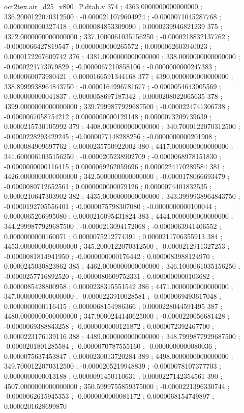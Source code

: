 \begin{filecontents}[overwrite]{oct2tex.air_d25_v800_P.dtab.v}
374 ; 4363.0000000000000000 ; 336.2000122070312500 ; -0.0000211079604924 ; -0.0000071045287768 ; 0.0000000000327418 ; 0.0000084853309090 ; 0.0000239946821239
375 ; 4372.0000000000000000 ; 337.1000061035156250 ; -0.0000218832137762 ; -0.0000066427819547 ; 0.0000000000265572 ; 0.0000062603940023 ; 0.0000172267609742
376 ; 4381.0000000000000000 ; 338.0000000000000000 ; -0.0000221773079829 ; -0.0000067210858106 ; -0.0000000000247383 ; 0.0000060073980421 ; 0.0000166591344168
377 ; 4390.0000000000000000 ; 338.8999938964843750 ; -0.0000164996781677 ; -0.0000054643005569 ; 0.0000000000041837 ; 0.0000058697187342 ; 0.0000208022065635
378 ; 4399.0000000000000000 ; 339.7999877929687500 ; -0.0000224741306738 ; -0.0000067058754212 ; 0.0000000000129148 ; 0.0000073209739639 ; 0.0000215730105992
379 ; 4408.0000000000000000 ; 340.7000122070312500 ; -0.0000228293429245 ; -0.0000077148288256 ; -0.0000000000201908 ; 0.0000084909697762 ; 0.0000235750922002
380 ; 4417.0000000000000000 ; 341.6000061035156250 ; -0.0000205238902709 ; -0.0000068978151830 ; -0.0000000000116415 ; 0.0000069262059696 ; 0.0000224170289584
381 ; 4426.0000000000000000 ; 342.5000000000000000 ; -0.0000178066693479 ; -0.0000080712652561 ; 0.0000000000079126 ; 0.0000074401832535 ; 0.0000210647303902
382 ; 4435.0000000000000000 ; 343.3999938964843750 ; -0.0000192705556401 ; -0.0000075798307080 ; -0.0000000000100044 ; 0.0000065266995080 ; 0.0000216095431824
383 ; 4444.0000000000000000 ; 344.2999877929687500 ; -0.0000213094172068 ; -0.0000063941406552 ; 0.0000000000160071 ; 0.0000075212774391 ; 0.0000211706355913
384 ; 4453.0000000000000000 ; 345.2000122070312500 ; -0.0000212911327253 ; -0.0000081814941950 ; -0.0000000000176442 ; 0.0000083988124970 ; 0.0000245030823862
385 ; 4462.0000000000000000 ; 346.1000061035156250 ; -0.0000257716892520 ; -0.0000080609752331 ; 0.0000000000103682 ; 0.0000085428800958 ; 0.0000238315551542
386 ; 4471.0000000000000000 ; 347.0000000000000000 ; -0.0000223910028581 ; -0.0000069493617048 ; 0.0000000000116415 ; 0.0000068154986366 ; 0.0000228044591495
387 ; 4480.0000000000000000 ; 347.9000244140625000 ; -0.0000220056681428 ; -0.0000069388843258 ; -0.0000000000121872 ; 0.0000072392467700 ; 0.0000223176139116
388 ; 4489.0000000000000000 ; 348.7999877929687500 ; -0.0000201801285584 ; -0.0000070787555160 ; -0.0000000000080036 ; 0.0000075637453847 ; 0.0000230013720284
389 ; 4498.0000000000000000 ; 349.7000122070312500 ; -0.0000205219948839 ; -0.0000078107377703 ; 0.0000000000013188 ; 0.0000091450110631 ; 0.0000227142354561
390 ; 4507.0000000000000000 ; 350.5999755859375000 ; -0.0000221396330744 ; -0.0000062615945353 ; -0.0000000000081172 ; 0.0000068154749897 ; 0.0000201628699870

\end{filecontents}
